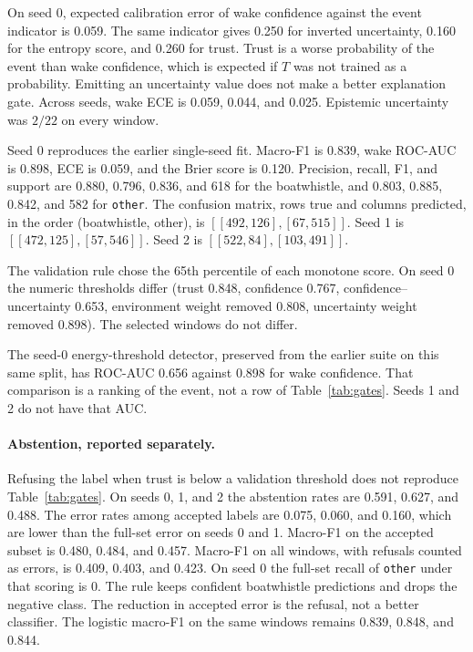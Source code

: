 \documentclass[sn-mathphys-num]{sn-jnl}%
\theoremstyle{thmstyleone}%
\theoremstyle{thmstyletwo}%
\theoremstyle{thmstylethree}%
\begin{document}
On seed 0, expected calibration error of wake confidence against the event indicator is 0.059. The same indicator gives 0.250 for inverted uncertainty, 0.160 for the entropy score, and 0.260 for trust. Trust is a worse probability of the event than wake confidence, which is expected if $T$ was not trained as a probability. Emitting an uncertainty value does not make a better explanation gate. Across seeds, wake ECE is 0.059, 0.044, and 0.025. Epistemic uncertainty was $2/22$ on every window.

Seed 0 reproduces the earlier single-seed fit. Macro-F1 is 0.839, wake ROC-AUC is 0.898, ECE is 0.059, and the Brier score is 0.120. Precision, recall, F1, and support are 0.880, 0.796, 0.836, and 618 for the boatwhistle, and 0.803, 0.885, 0.842, and 582 for \texttt{other}. The confusion matrix, rows true and columns predicted, in the order (boatwhistle, other), is $[[492, 126], [67, 515]]$. Seed 1 is $[[472, 125], [57, 546]]$. Seed 2 is $[[522, 84], [103, 491]]$.

The validation rule chose the 65th percentile of each monotone score. On seed 0 the numeric thresholds differ (trust 0.848, confidence 0.767, confidence--uncertainty 0.653, environment weight removed 0.808, uncertainty weight removed 0.898). The selected windows do not differ.

The seed-0 energy-threshold detector, preserved from the earlier suite on this same split, has ROC-AUC 0.656 against 0.898 for wake confidence. That comparison is a ranking of the event, not a row of Table~\ref{tab:gates}. Seeds 1 and 2 do not have that AUC.

\paragraph{Abstention, reported separately.}
Refusing the label when trust is below a validation threshold does not reproduce Table~\ref{tab:gates}. On seeds 0, 1, and 2 the abstention rates are 0.591, 0.627, and 0.488. The error rates among accepted labels are 0.075, 0.060, and 0.160, which are lower than the full-set error on seeds 0 and 1. Macro-F1 on the accepted subset is 0.480, 0.484, and 0.457. Macro-F1 on all windows, with refusals counted as errors, is 0.409, 0.403, and 0.423. On seed 0 the full-set recall of \texttt{other} under that scoring is 0. The rule keeps confident boatwhistle predictions and drops the negative class. The reduction in accepted error is the refusal, not a better classifier. The logistic macro-F1 on the same windows remains 0.839, 0.848, and 0.844.
\end{document}

